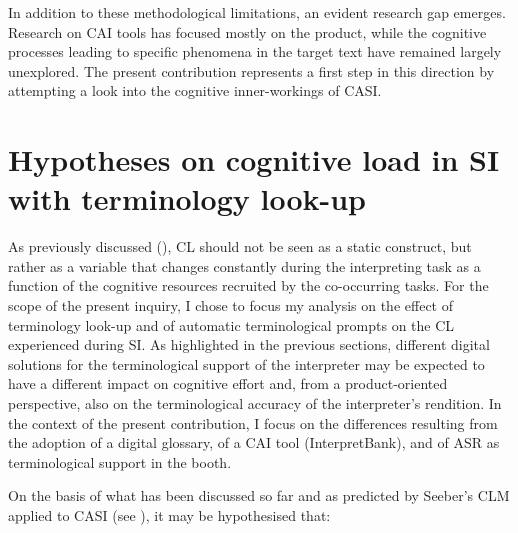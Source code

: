 \begin{sloppypar}
In addition to these methodological limitations, an evident research gap emerges. Research on CAI tools has focused mostly on the product, while the cognitive processes leading to specific phenomena in the target text have remained largely unexplored. The present contribution represents a first step in this direction by attempting a look into the cognitive inner-workings of CASI.
\end{sloppypar}

\section{Hypotheses on cognitive load in SI with terminology look-up} \label{hypotheses}
As previously discussed (), CL should not be seen as a static construct, but rather as a variable that changes constantly during the interpreting task as a function of the cognitive resources recruited by the co-occurring tasks. For the scope of the present inquiry, I chose to focus my analysis on the effect of terminology look-up and of automatic terminological prompts on the CL experienced during SI. As highlighted in the previous sections, different digital solutions for the terminological support of the interpreter may be expected to have a different impact on cognitive effort and, from a product-oriented perspective, also on the terminological accuracy of the interpreter's rendition. In the context of the present contribution, I focus on the differences resulting from the adoption of a digital glossary, of a CAI tool (InterpretBank), and of ASR as terminological support in the booth.

On the basis of what has been discussed so far and as predicted by Seeber's CLM applied to CASI (see ), it may be hypothesised that:

